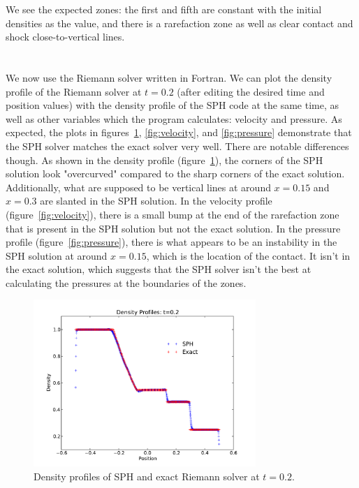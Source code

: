 \documentclass[11pt,letterpaper]{article}
\begin{document}
We see the expected zones: the first and fifth are constant with the initial densities
as the value, and there is a rarefaction zone as well as clear contact and shock 
close-to-vertical lines.


\section{}

We now use the Riemann solver written in Fortran. We can plot the density profile of 
the Riemann solver at $t=0.2$ (after editing the desired time and position values) 
with the density profile of the SPH code at the same time,
as well as other variables which the program calculates: velocity and pressure. 
As expected, the plots in figures~\ref{fig:density}, \ref{fig:velocity}, 
and \ref{fig:pressure} demonstrate that the SPH solver matches the exact solver 
very well. There are notable differences though. As shown in the density profile 
(figure~\ref{fig:density}), the corners of the SPH solution look "overcurved" 
compared to the sharp corners of the exact solution. Additionally, 
what are supposed to be vertical lines at around $x=0.15$
and $x=0.3$ are slanted in the SPH solution. In the velocity profile 
(figure~\ref{fig:velocity}), there is a small bump at the end of the rarefaction zone
that is present in the SPH solution but not the exact solution. 
In the pressure profile (figure~\ref{fig:pressure}), there is what appears to be 
an instability in the SPH solution at around $x=0.15$, which is the location of the
contact. It isn't in the exact solution, which 
suggests that the SPH solver isn't the best at calculating the pressures at the
boundaries of the zones.

\begin{figure}[bth]
\centering
\includegraphics[width=0.75\textwidth]{density.pdf}
\caption{Density profiles of SPH and exact Riemann solver at $t=0.2$.}
\label{fig:density}
\end{figure}
\end{document}
